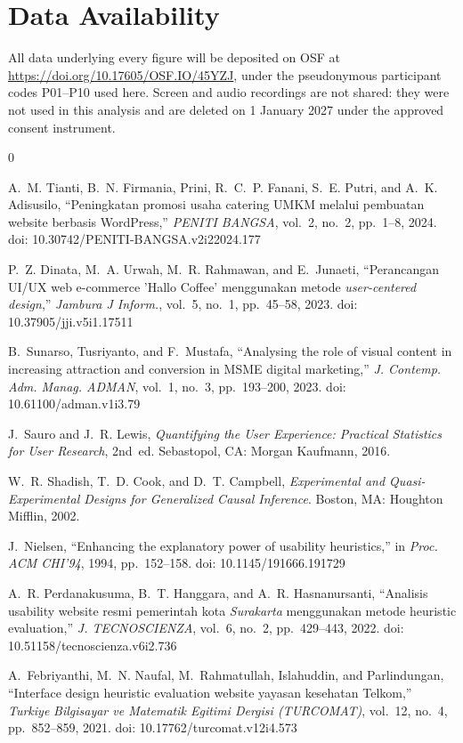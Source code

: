 \documentclass[conference]{IEEEtran}
\begin{document}
\section*{Data Availability}
All data underlying every figure will be deposited on OSF at \url{https://doi.org/10.17605/OSF.IO/45YZJ},
under the pseudonymous participant codes P01--P10 used here. Screen and audio recordings are not
shared: they were not used in this analysis and are deleted on 1 January 2027 under the approved
consent instrument.

\begin{thebibliography}{0}

A.~M. Tianti, B.~N. Firmania, Prini, R.~C.~P. Fanani, S.~E. Putri, and
A.~K. Adisusilo, ``Peningkatan promosi usaha catering UMKM melalui pembuatan
website berbasis WordPress,'' \textit{PENITI BANGSA}, vol.~2, no.~2, pp.~1--8,
2024. doi: 10.30742/PENITI-BANGSA.v2i22024.177

P.~Z. Dinata, M.~A. Urwah, M.~R. Rahmawan, and E.~Junaeti, ``Perancangan
UI/UX web e-commerce 'Hallo Coffee' menggunakan metode \emph{user-centered
design},'' \textit{Jambura J Inform.}, vol.~5, no.~1, pp.~45--58, 2023.
doi: 10.37905/jji.v5i1.17511

B.~Sunarso, Tusriyanto, and F.~Mustafa, ``Analysing the role of visual content
in increasing attraction and conversion in MSME digital marketing,''
\textit{J. Contemp. Adm. Manag. ADMAN}, vol.~1, no.~3, pp.~193--200, 2023.
doi: 10.61100/adman.v1i3.79

J.~Sauro and J.~R. Lewis, \emph{Quantifying the User Experience: Practical
Statistics for User Research}, 2nd~ed. Sebastopol, CA: Morgan Kaufmann, 2016.

W.~R. Shadish, T.~D. Cook, and D.~T. Campbell, \emph{Experimental and
Quasi-Experimental Designs for Generalized Causal Inference}. Boston, MA:
Houghton Mifflin, 2002.

J.~Nielsen, ``Enhancing the explanatory power of usability heuristics,''
in \emph{Proc. ACM CHI'94}, 1994, pp.~152--158.
doi: 10.1145/191666.191729

A.~R. Perdanakusuma, B.~T. Hanggara, and A.~R. Hasnanursanti, ``Analisis
usability website resmi pemerintah kota \emph{Surakarta} menggunakan metode
heuristic evaluation,'' \textit{J. TECNOSCIENZA}, vol.~6, no.~2,
pp.~429--443, 2022. doi: 10.51158/tecnoscienza.v6i2.736

A.~Febriyanthi, M.~N. Naufal, M.~Rahmatullah, Islahuddin, and
Parlindungan, ``Interface design heuristic evaluation website yayasan
kesehatan Telkom,'' \textit{Turkiye}
\textit{Bilgisayar ve Matematik Egitimi Dergisi (TURCOMAT)},
vol.~12, no.~4, pp.~852--859, 2021. doi: 10.17762/turcomat.v12i4.573

\end{thebibliography}
\end{document}
